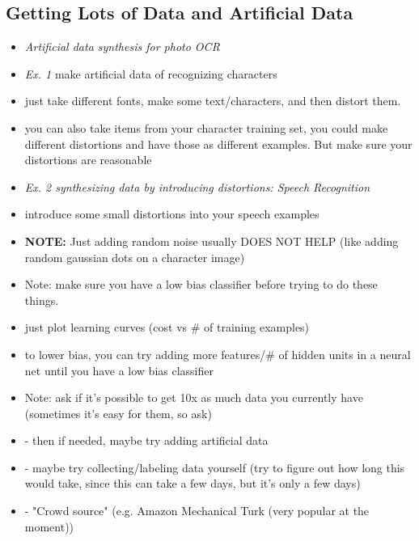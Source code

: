 \documentclass[]{article}
\begin{document}
	\subsection{Getting Lots of Data and Artificial Data}
		\begin{itemize}
			\item \emph{Artificial data synthesis for photo OCR}
			\item \emph{Ex. 1} make artificial data of recognizing characters
			\item just take different fonts, make some text/characters, and then distort them.
			\item you can also take items from your character training set, you could make different distortions and have those as different examples. But make sure your distortions are reasonable
			\item \emph{Ex. 2 synthesizing data by introducing distortions: Speech Recognition}
			\item introduce some small distortions into your speech examples
			\item \textbf{NOTE:} Just adding random noise usually DOES NOT HELP (like adding random gaussian dots on a character image)
			\item Note: make sure you have a low bias classifier before trying to do these things.
			\item just plot learning curves (cost vs \# of training examples)
			\item to lower bias, you can try adding more features/\# of hidden units in a neural net until you have a low bias classifier
			\item Note: ask if it's possible to get 10x as much data you currently have (sometimes it's easy for them, so ask)
			\item - then if needed, maybe try adding artificial data
			\item - maybe try collecting/labeling data yourself (try to figure out how long this would take, since this can take a few days, but it's only a few days)
			\item - "Crowd source" (e.g. Amazon Mechanical Turk (very popular at the moment))
			
		\end{itemize}
		
\end{document}
